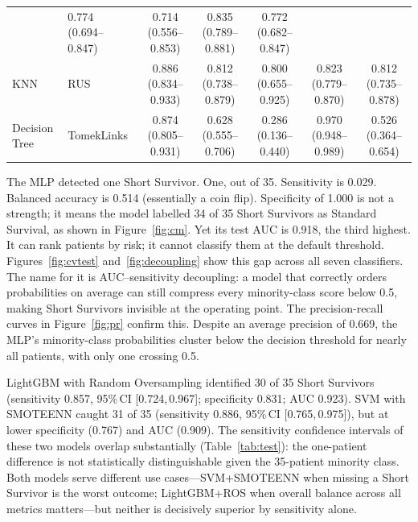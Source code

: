 \documentclass[preprint,12pt]{elsarticle}
\begin{document}
\begin{table}[ht!]
{\begin{tabular}{llccccc}
      & 0.774 {\small(0.694--0.847)}
      & 0.714 {\small(0.556--0.853)}
      & 0.835 {\small(0.789--0.881)}
      & 0.772 {\small(0.682--0.847)} \\
    KNN
      & RUS
      & 0.886 {\small(0.834--0.933)}
      & 0.812 {\small(0.738--0.879)}
      & 0.800 {\small(0.655--0.925)}
      & 0.823 {\small(0.779--0.870)}
      & 0.812 {\small(0.735--0.878)} \\
    Decision Tree
      & TomekLinks
      & 0.874 {\small(0.805--0.931)}
      & 0.628 {\small(0.555--0.706)}
      & 0.286 {\small(0.136--0.440)}
      & 0.970 {\small(0.948--0.989)}
      & 0.526 {\small(0.364--0.654)} \\
    \bottomrule
  \end{tabular}%
  }
\end{table}

The MLP detected one Short Survivor. One, out of 35.
Sensitivity is 0.029. Balanced accuracy is 0.514 (essentially a coin flip).
Specificity of 1.000 is not a strength; it means the model labelled 34 of 35
Short Survivors as Standard Survival, as shown in Figure~\ref{fig:cm}.
Yet its test AUC is 0.918, the third highest. It can rank patients by risk;
it cannot classify them at the default threshold. Figures~\ref{fig:cvtest}
and~\ref{fig:decoupling} show this gap across all seven classifiers.
The name for it is AUC--sensitivity decoupling: a model that correctly orders
probabilities on average can still compress every minority-class score below
0.5, making Short Survivors invisible at the operating point. The
precision-recall curves in Figure~\ref{fig:pr} confirm this. Despite an average
precision of 0.669, the MLP's minority-class probabilities cluster below
the decision threshold for nearly all patients, with only one crossing 0.5.

LightGBM with Random Oversampling identified 30 of 35 Short Survivors
(sensitivity 0.857, 95\%\,CI [0.724,\,0.967]; specificity 0.831; AUC 0.923).
SVM with SMOTEENN caught 31 of 35 (sensitivity 0.886, 95\%\,CI
[0.765,\,0.975]), but at lower specificity (0.767) and AUC (0.909). The
sensitivity confidence intervals of these two models overlap substantially
(Table~\ref{tab:test}): the one-patient difference is not statistically
distinguishable given the 35-patient minority class. Both models serve
different use cases---SVM+SMOTEENN when missing a Short Survivor is the
worst outcome; LightGBM+ROS when overall balance across all metrics
matters---but neither is decisively superior by sensitivity alone.
\end{document}
